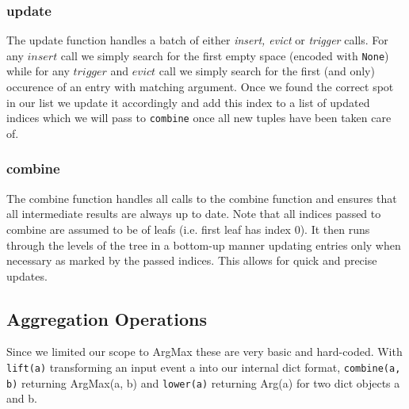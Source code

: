 \subsubsection{update}
The update function handles a batch of either \textit{insert, evict} or \textit{trigger}
calls. For any $insert$ call we simply search for the first empty space
(encoded with \texttt{None})
while for any $trigger$ and $evict$ call we simply search for the first (and only) occurence of
an entry with matching argument. Once we found the correct spot in our list we
update it accordingly and add this index to a list of updated indices which we will
pass to \texttt{combine} once all new tuples have been taken care of.


\subsubsection{combine}
The combine function handles all calls to the combine function and ensures that all
intermediate results are always up to date. Note that all indices passed to combine
are assumed to be of leafs (i.e. first leaf has index 0). It then runs through the
levels of the tree in a bottom-up manner updating entries only when necessary as
marked by the passed indices. This allows for quick and precise updates.

\subsection{Aggregation Operations}
Since we limited our scope to ArgMax these are very basic and hard-coded. With \texttt{lift(a)}
transforming an input event a into our internal dict format, \texttt{combine(a, b)} returning ArgMax(a, b)
and \texttt{lower(a)} returning Arg(a) for two dict objects a and b.
